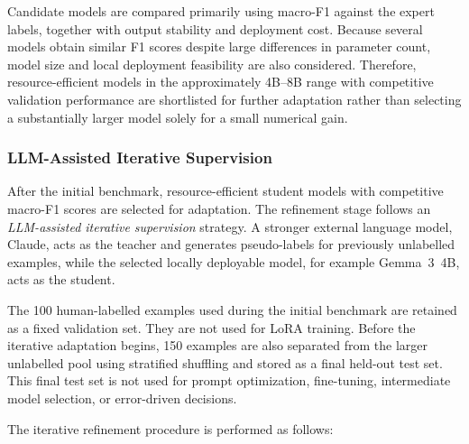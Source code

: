 \documentclass[11pt,a4paper]{article}
\begin{document}
Candidate models are compared primarily using macro-F1 against the expert
labels, together with output stability and deployment cost. Because several
models obtain similar F1 scores despite large differences in parameter count,
model size and local deployment feasibility are also considered. Therefore,
resource-efficient models in the approximately 4B--8B range with competitive
validation performance are shortlisted for further adaptation rather than
selecting a substantially larger model solely for a small numerical gain.
\subsubsection{LLM-Assisted Iterative Supervision}
\label{subsec:llm_iterative_supervision}

After the initial benchmark, resource-efficient student models with competitive
macro-F1 scores are selected for adaptation. The refinement stage follows an
\emph{LLM-assisted iterative supervision} strategy. A stronger external
language model, Claude, acts as the teacher and generates pseudo-labels for
previously unlabelled examples, while the selected locally deployable model,
for example Gemma~3~4B, acts as the student.

The 100 human-labelled examples used during the initial benchmark are retained
as a fixed validation set. They are not used for LoRA training. Before the
iterative adaptation begins, 150 examples are also separated from the larger
unlabelled pool using stratified shuffling and stored as a final held-out test
set. This final test set is not used for prompt optimization, fine-tuning,
intermediate model selection, or error-driven decisions.

The iterative refinement procedure is performed as follows:
\end{document}
